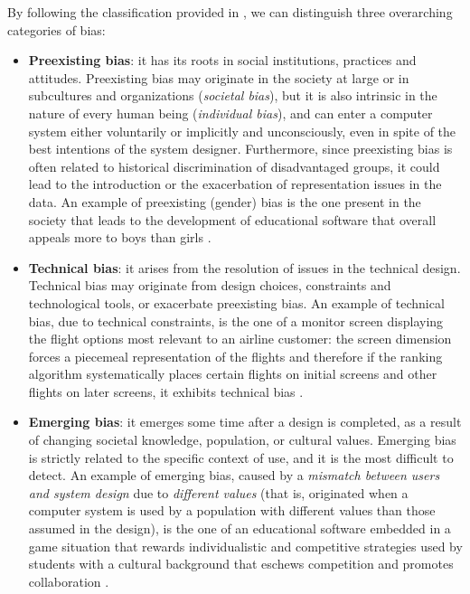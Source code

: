 By following the classification provided in \cite{friedman2017bias}, we can distinguish three overarching categories of bias:
\begin{itemize}
\item \textbf{Preexisting bias}: it has its roots in social institutions, practices and attitudes. Preexisting bias may originate in the society at large or in subcultures and organizations (\textit{societal bias}), but it is also intrinsic in the nature of every human being (\textit{individual bias}), and can enter a computer system either voluntarily or implicitly and unconsciously, even in spite of the best intentions of the system designer. Furthermore, since preexisting bias is often related to historical discrimination of disadvantaged groups, it could lead to the introduction or the exacerbation of representation issues in the data.
An example of preexisting (gender) bias is the one present in the society that leads to the development of educational software that overall appeals more to boys than girls \cite{friedman2017bias}.
\item \textbf{Technical bias}: it arises from the resolution of issues in the technical design. Technical bias may originate from design choices, constraints and technological tools, or exacerbate preexisting bias.
An example of technical bias, due to technical constraints, is the one of a monitor screen displaying the flight options most relevant to an airline customer: the screen dimension forces a piecemeal representation of the flights and therefore if the ranking algorithm systematically places certain flights on initial screens and other flights on later screens, it exhibits technical bias \cite{friedman2017bias}.
\item \textbf{Emerging bias}: it emerges some time after a design is completed, as a result of changing societal knowledge, population, or cultural values. Emerging bias is strictly related to the specific context of use, and it is the most difficult to detect.
An example of emerging bias, caused by a \textit{mismatch between users and system design} due to \textit{different values} (that is, originated when a computer system is used by a population with different values than those assumed in the design), is the one of an educational software embedded in a game situation that rewards individualistic and competitive strategies used by students with a cultural background that eschews competition and promotes collaboration \cite{friedman2017bias}.
\end{itemize}

